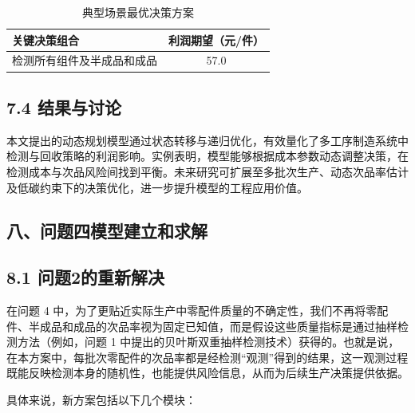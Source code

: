 \documentclass{article}
\begin{document}
	\begin{table}[htbp]
		\centering
		\caption{典型场景最优决策方案}
		\begin{tabular}{lc}
			关键决策组合         & 利润期望（元/件） \\
			\hline %
			检测所有组件及半成品和成品 & 57.0              \\
		\end{tabular}
	\end{table}
	
	\subsection*{7.4 结果与讨论}  
	本文提出的动态规划模型通过状态转移与递归优化，有效量化了多工序制造系统中检测与回收策略的利润影响。实例表明，模型能够根据成本参数动态调整决策，在检测成本与次品风险间找到平衡。未来研究可扩展至多批次生产、动态次品率估计及低碳约束下的决策优化，进一步提升模型的工程应用价值。  
	
	
	

	\begin{center}
		\section*{八、问题四模型建立和求解}
	\end{center}

	
	\subsection*{8.1 问题2的重新解决}
	
	在问题 4 中，为了更贴近实际生产中零配件质量的不确定性，我们不再将零配件、半成品和成品的次品率视为固定已知值，而是假设这些质量指标是通过抽样检测方法（例如，问题 1 中提出的贝叶斯双重抽样检测技术）获得的。也就是说，在本方案中，每批次零配件的次品率都是经检测“观测”得到的结果，这一观测过程既能反映检测本身的随机性，也能提供风险信息，从而为后续生产决策提供依据。
	
	具体来说，新方案包括以下几个模块：
	
\end{document}
